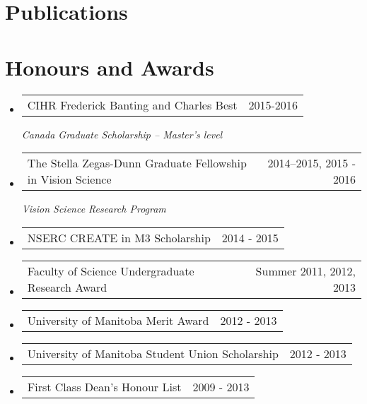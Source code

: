 \documentclass[letterpaper,12pt]{article}
\makeatletter
\newcommand{\resumeAwardItem}[3][\vspace{-7pt}]{
	\item
    \begin{tabular*}{0.94\textwidth}[t]{l@{\extracolsep{\fill}}r}
     {\small#2} & \small#3      
    \end{tabular*}
	{\textit{\small#1}}\vspace{-7pt}
}
\newcommand{\resumeItemListStart}{\begin{itemize}}
\newcommand{\resumeItemListEnd}{\end{itemize}\vspace{-5pt}}
\makeatother
\begin{document}
\section{Publications}
% 



\section{Honours and Awards}

\resumeItemListStart
    	\resumeAwardItem[Canada Graduate Scholarship -- Master's level]{CIHR Frederick Banting and Charles Best}{2015-2016} 
	\resumeAwardItem[Vision Science Research Program]{The Stella Zegas-Dunn Graduate Fellowship in Vision Science}{2014–2015, 2015 - 2016} 
	\resumeAwardItem{NSERC CREATE in M3 Scholarship}{2014 - 2015}
	\resumeAwardItem{Faculty of Science Undergraduate Research Award}{Summer 2011, 2012, 2013}
	\resumeAwardItem{University of Manitoba Merit Award}{2012 - 2013}
	\resumeAwardItem{University of Manitoba Student Union Scholarship}{2012 - 2013}
	\resumeAwardItem{First Class Dean's Honour List}{2009 - 2013}
  \resumeItemListEnd  


\end{document}
